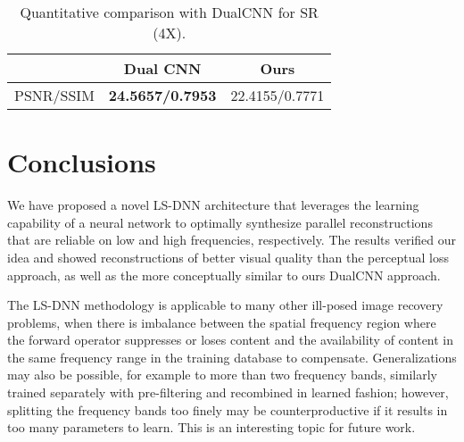 \documentclass[10pt,twocolumn,letterpaper]{article}
\begin{document}
\begin{table}[h!]
\caption{Quantitative comparison with DualCNN \cite{Pan_2018_CVPR} for SR (4X).}
\centering
\begin{tabular}{@{}lll@{}}
\toprule
                              & \multicolumn{1}{c}{Dual CNN} & \multicolumn{1}{c}{Ours} \\ \midrule
\multicolumn{1}{c}{PSNR/SSIM} & \textbf{24.5657/0.7953}      & 22.4155/0.7771           \\ \bottomrule
\end{tabular}
\label{tab:comp}
\end{table}


\section{Conclusions}
We have proposed a novel LS-DNN architecture that leverages the learning capability of a neural network to optimally synthesize parallel reconstructions that are reliable on low and high frequencies, respectively. The results verified our idea and showed reconstructions of better visual quality than the perceptual loss \cite{johnson2016perceptual} approach, as well as the more conceptually similar to ours DualCNN approach\cite{Pan_2018_CVPR}. 

The LS-DNN methodology is applicable to many other ill-posed image recovery problems, when there is imbalance between the spatial frequency region where the forward operator suppresses or loses content and the availability of content in the same frequency range in the training database to compensate. Generalizations may also be possible, for example to more than two frequency bands, similarly trained separately with pre-filtering and recombined in learned fashion; however, splitting the frequency bands too finely may be counterproductive if it results in too many parameters to learn. This is an interesting topic for future work. 



{\small


}
\end{document}
